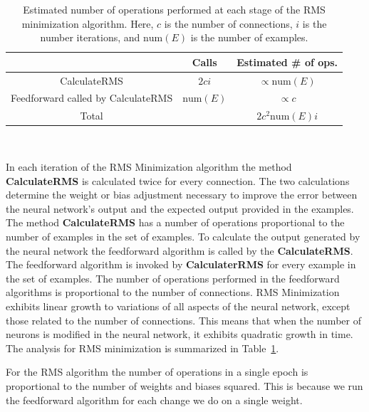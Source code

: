 \documentclass[11pt]{article}
\begin{document}
\begin{table}
	\begin{center}
		\begin{tabular}{ccc}
		\hline
		 & Calls & Estimated \# of ops.\\
		\hline
		CalculateRMS & $2ci$ & $\propto \mbox{num}(E)$\\
		Feedforward called by CalculateRMS & $\mbox{num}(E)$ & $\propto c$\\
		\hline
		Total &  & $2c^2\mbox{num}(E)i$\\
		\hline
		\end{tabular}	
	\end{center}
	\caption{Estimated number of operations performed at each stage of the RMS minimization algorithm. Here, $c$ is the number of connections, $i$ is the number iterations, and $\mbox{num}(E)$ is the number of examples.}~\label{tab:RMSminimization}
\end{table}

In each iteration of the RMS Minimization algorithm the method \textbf{CalculateRMS} is calculated twice for every connection. The two
calculations determine the weight or bias adjustment necessary to improve the error between the neural network's output and the expected
output provided in the examples. The method \textbf{CalculateRMS} has a number of operations proportional to the number of examples in
the set of examples. To calculate the output generated by the neural network the feedforward algorithm is called by the
\textbf{CalculateRMS}. The feedforward algorithm is invoked by \textbf{CalculaterRMS} for every example in the set of examples. The
number of operations performed in the feedforward algorithms is proportional to the number of connections. RMS Minimization exhibits
linear growth to variations of all aspects of the neural network, except those related to the number of connections. This means that
when the number of neurons is modified in the neural network, it exhibits quadratic growth in time. The analysis for RMS minimization is
summarized in Table~\ref{tab:RMSminimization}.

For the RMS algorithm the number of operations in a single epoch is proportional to the number of weights and biases squared. This is
because we run the feedforward algorithm for each change we do on a single weight.
\end{document}
